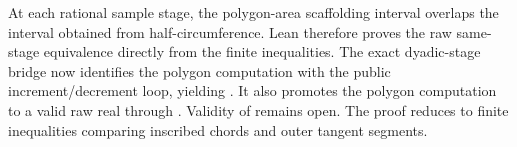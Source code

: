 \begin{theorem}\label{thm:finite-archimedes}
At each rational sample stage, the polygon-area scaffolding interval overlaps
the interval obtained from half-circumference.  Lean therefore proves the raw
same-stage equivalence
 directly from
the finite inequalities.  The exact dyadic-stage bridge
now identifies the polygon computation with the public increment/decrement
 loop, yielding
.
It also promotes the polygon computation to a valid raw real through
.  Validity of  remains
open.
The proof reduces to finite inequalities comparing inscribed chords and
outer tangent segments.
\end{theorem}

